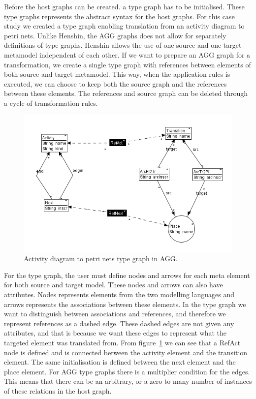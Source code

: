 \noindent Before the host graphs can be created. a type graph has to be
initialised. These type graphs represents the abstract syntax for the host
graphs. For this case study we created a type graph enabling translation from
an activity diagram to petri nets. Unlike Henshin, the AGG graphs does not
allow for separately definitions of type graphs. Henshin allows the use of one
source and one target metamodel independent of each other. If we want to
prepare an AGG graph for a transformation, we create a single type graph with
references between elements of both source and target metamodel. This way, when
the application rules is executed, we can choose to keep both the source graph
and the references between these elements. The references and source graph can
be deleted through a cycle of transformation rules.

\begin{figure}[H]
	\centering
	\includegraphics[scale=0.7]{figures/AggTypeGraph.png}
	\caption{Activity diagram to petri nets type graph in AGG.}
	\label{fig:AggTypeGraph}
\end{figure}

\indent For the type graph, the user must define nodes and arrows for each meta
element for both source and target model. These nodes and arrows can also have
attributes. Nodes represents elements from the two modelling languages and
arrows represents the associations between these elements. In the type graph we
want to distinguish between associations and references, and therefore we
represent references as a dashed edge. These dashed edges are not given any
attributes, and that is because we want these edges to represent what the
targeted element was translated from. From figure~\ref{fig:AggTypeGraph} we can
see that a RefAct node is defined and is connected between the activity
element and the transition element. The same initialisation is defined between
the next element and the place element. For AGG type graphs there is a
multiplier condition for the edges. This means that there can be an arbitrary,
or a zero to many number of instances of these relations in the host graph.

